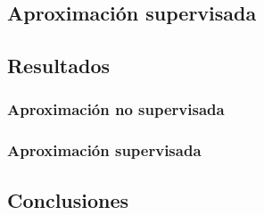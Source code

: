 \subsection{Aproximación supervisada}


\subsection{Resultados}

\subsubsection{Aproximación no supervisada}


\subsubsection{Aproximación supervisada}


\subsection{Conclusiones}